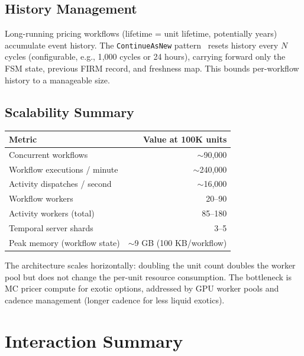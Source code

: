 \documentclass[11pt,a4paper]{article}
\begin{document}
\subsection{History Management}

Long-running pricing workflows (lifetime = unit lifetime, potentially years) accumulate event history.  The \texttt{ContinueAsNew} pattern~\cite[\S14.12]{ledger} resets history every $N$ cycles (configurable, e.g., 1{,}000 cycles or 24 hours), carrying forward only the FSM state, previous FIRM record, and freshness map.  This bounds per-workflow history to a manageable size.

\subsection{Scalability Summary}

\begin{center}
\small
\begin{tabular}{l r}
\toprule
\textbf{Metric} & \textbf{Value at 100K units} \\
\midrule
Concurrent workflows & $\sim$90{,}000 \\
Workflow executions / minute & $\sim$240{,}000 \\
Activity dispatches / second & $\sim$16{,}000 \\
Workflow workers & 20--90 \\
Activity workers (total) & 85--180 \\
Temporal server shards & 3--5 \\
Peak memory (workflow state) & $\sim$9 GB (100 KB/workflow) \\
\bottomrule
\end{tabular}
\end{center}

The architecture scales horizontally: doubling the unit count doubles the worker pool but does not change the per-unit resource consumption.  The bottleneck is MC pricer compute for exotic options, addressed by GPU worker pools and cadence management (longer cadence for less liquid exotics).

\clearpage
\section{Interaction Summary}
\label{sec:interactions}
\end{document}
